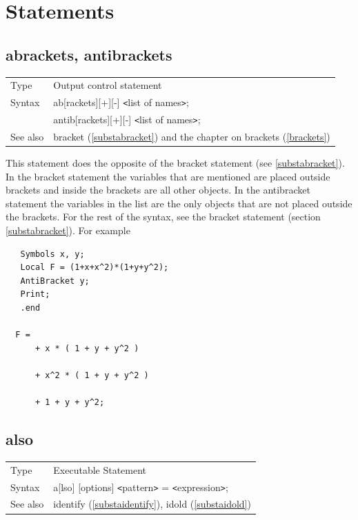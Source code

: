 
\chapter{Statements}
\label{statements}


\section{abrackets, antibrackets}
\label{substaabrackets}

\noindent \begin{tabular}{ll}
Type & Output control statement\\
Syntax & ab[rackets][+][-] {\tt<}list of names{\tt>}; \\
& antib[rackets][+][-] {\tt<}list of names{\tt>}; \\
See also & bracket (\ref{substabracket}) and the chapter on brackets 
     (\ref{brackets})
\end{tabular} \vspace{4mm}

\noindent
This statement does the opposite of 
the bracket statement (see \ref{substabracket}). In the bracket statement 
the variables that are mentioned are placed outside brackets and inside the 
brackets are all other objects. In the antibracket statement the variables 
in the list are the only objects that are not placed outside the brackets. 
For the rest of the syntax, see the bracket statement (section 
\ref{substabracket}).
\noindent
For example
\begin{verbatim}
   Symbols x, y;
   Local F = (1+x+x^2)*(1+y+y^2);
   AntiBracket y;
   Print;
   .end

  F =
      + x * ( 1 + y + y^2 )

      + x^2 * ( 1 + y + y^2 )

      + 1 + y + y^2;
\end{verbatim}
\vspace{10mm}
 
\section{also}
\label{substaalso}

\noindent \begin{tabular}{ll}
Type & Executable Statement \\
Syntax & a[lso] [options] {\tt<}pattern{\tt>} = 
         {\tt<}expression{\tt>}; \\
See also & identify (\ref{substaidentify}), idold (\ref{substaidold})
\end{tabular} \vspace{4mm}

